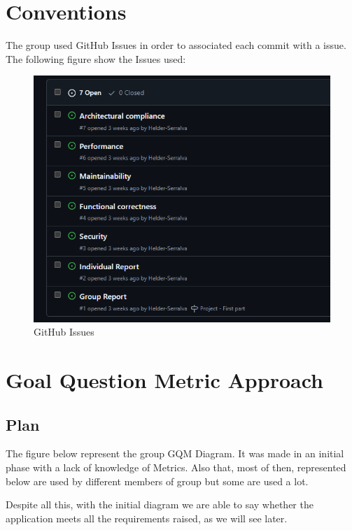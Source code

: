 \documentclass[a4paper,11pt,openright,BCOR=15mm]{scrbook}
\begin{document}
	\chapter{Conventions }
	The group used GitHub Issues in order to associated each commit with a issue. The following figure show the Issues used:
	\begin{figure}[H]
		\includegraphics[width=\textwidth]{figs/Issues.png}
		\caption{GitHub Issues}
		\label{fig:Issues}
		\centering
	\end{figure}
	
	\chapter{Goal Question Metric Approach}
	\section{Plan}
	
	The figure below represent the group GQM Diagram. It was made in an initial phase with a lack of knowledge of Metrics. Also that, most of then, represented below are used by different members of group but some are used a lot.
	
	Despite all this, with the initial diagram we are able to say whether the application meets all the requirements raised, as we will see later.
	
\end{document}
